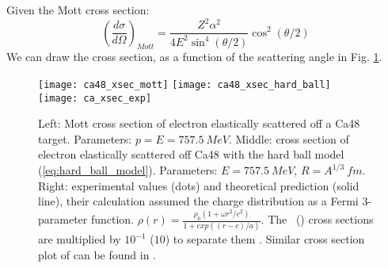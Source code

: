 Given the Mott cross section:
\begin{equation}
    \left( \frac{d\sigma}{d\Omega} \right)_{Mott} = 
	\frac{Z^2 \alpha^2}{4E^2\sin^4(\theta/2)}\cos^2(\theta/2)   
\end{equation}
We can draw the cross section, as a function of the scattering angle in Fig. \ref{fig:ca_xsec}.
\begin{figure}
    \texttt{[image: ca48\_xsec\_mott]}
    \texttt{[image: ca48\_xsec\_hard\_ball]}
    \texttt{[image: ca\_xsec\_exp]}
    \caption{Left: Mott cross section of electron elastically scattered off a Ca48
    target. Parameters: $p=E=757.5 \ MeV$.
    Middle: cross section of electron elastically scattered off Ca48 with the hard ball
    model (\ref{eq:hard_ball_model}). Parameters: $E =  757.5\ MeV$, $R=A^{1/3}\ fm$. 
    Right: experimental values (dots) and theoretical prediction (solid line),
    their calculation assumed the charge distribution as a Fermi 3-parameter function.
    $\rho(r) = \frac{\rho_0(1 + \omega r^2/c^2)}{1 + exp((r-c)/a)}$. The \Ca \ (\ca)
    cross sections are multiplied by $10^{-1}$ ($10$) to separate them
    \cite{PhysRevLett.19.527}. Similar cross section plot of \Pb can be found
    in \cite{PhysRevLett.38.152}.
    }
    \label{fig:ca_xsec}
\end{figure}

